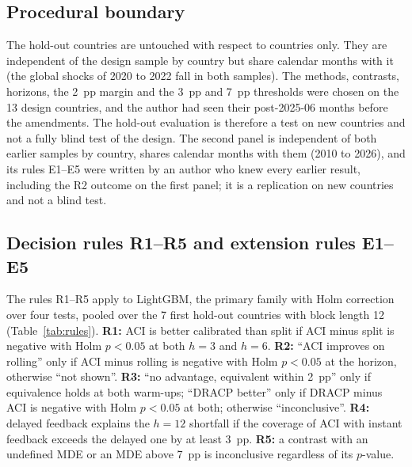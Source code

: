 \subsection{Procedural boundary}\label{sec:boundary}

The hold-out countries are untouched with respect to countries only. They are independent of the design sample by country but share calendar months with it (the global shocks of 2020 to 2022 fall in both samples). The methods, contrasts, horizons, the 2~pp margin and the 3~pp and 7~pp thresholds were chosen on the 13 design countries, and the author had seen their post-2025-06 months before the amendments. The hold-out evaluation is therefore a test on new countries and not a fully blind test of the design. The second panel is independent of both earlier samples by country, shares calendar months with them (2010 to 2026), and its rules E1--E5 were written by an author who knew every earlier result, including the R2 outcome on the first panel; it is a replication on new countries and not a blind test.

\subsection{Decision rules R1--R5 and extension rules E1--E5}\label{sec:rules}

The rules R1--R5 apply to LightGBM, the primary family with Holm correction over four tests, pooled over the 7 first hold-out countries with block length 12 (Table~\ref{tab:rules}). \textbf{R1:} ACI is better calibrated than split if ACI minus split is negative with Holm $p<0.05$ at both $h=3$ and $h=6$. \textbf{R2:} ``ACI improves on rolling'' only if ACI minus rolling is negative with Holm $p<0.05$ at the horizon, otherwise ``not shown''. \textbf{R3:} ``no advantage, equivalent within 2~pp'' only if equivalence holds at both warm-ups; ``DRACP better'' only if DRACP minus ACI is negative with Holm $p<0.05$ at both; otherwise ``inconclusive''. \textbf{R4:} delayed feedback explains the $h=12$ shortfall if the coverage of ACI with instant feedback exceeds the delayed one by at least 3~pp. \textbf{R5:} a contrast with an undefined MDE or an MDE above 7~pp is inconclusive regardless of its $p$-value.

\begin{table}[t]
\centering
\caption{Decision rules R1--R5 and extension rules E1--E5 as pre-specified, with their recorded outcomes.}
\label{tab:rules}
\small
\fittable{}
\end{table}

